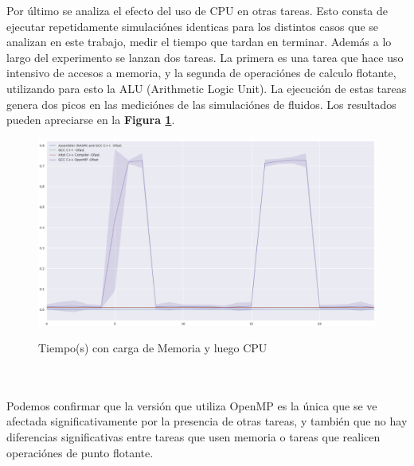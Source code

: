 Por último se analiza el efecto del uso de CPU en otras tareas. Esto consta de ejecutar repetidamente simulaciónes identicas para los distintos casos que se analizan en este trabajo, medir el tiempo que tardan en terminar. Además a lo largo del experimento se lanzan dos tareas. La primera es una tarea que hace uso intensivo de accesos a memoria, y la segunda de operaciónes de calculo flotante, utilizando para esto la ALU (Arithmetic Logic Unit). La ejecución de estas tareas genera dos picos en las mediciónes de  las simulaciónes de fluidos. Los resultados pueden apreciarse en la \textbf{Figura \ref{fig:plot_stress_test_ram_cpu}}. 
\begin{figure}[!htbp]
\caption{Tiempo(s) con carga de Memoria y luego CPU}
\includegraphics[width=\textwidth]{imagenes/plot_stress_test_ram_cpu.png}
\label{fig:plot_stress_test_ram_cpu}
\end{figure}
~\\
~\\
Podemos confirmar que la versión que utiliza OpenMP es la única que se ve afectada significativamente por la presencia de otras tareas, y también que no hay diferencias significativas entre tareas que usen memoria o tareas que realicen operaciónes de punto flotante.





